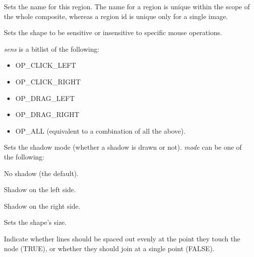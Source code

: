 Sets the name for this region. The name for a region is unique within the scope of the whole
composite, whereas a region id is unique only for a single image.

\label{wxshapesetsensitivityfilter}


Sets the shape to be sensitive or insensitive to specific mouse operations.

{\it sens} is a bitlist of the following:

\begin{itemize}\itemsep=0pt
\item OP\_CLICK\_LEFT
\item OP\_CLICK\_RIGHT
\item OP\_DRAG\_LEFT
\item OP\_DRAG\_RIGHT
\item OP\_ALL (equivalent to a combination of all the above).
\end{itemize}

\label{wxshapesetshadowmode}


Sets the shadow mode (whether a shadow is drawn or not). {\it mode} can be one of
the following:

\begin{description}\itemsep=0pt
\item[SHADOW\_NONE] No shadow (the default).
\item[SHADOW\_LEFT] Shadow on the left side.
\item[SHADOW\_RIGHT] Shadow on the right side.
\end{description}



Sets the shape's size.



Indicate whether lines should be spaced out evenly at the point they touch the node (TRUE), or whether they
should join at a single point (FALSE).

